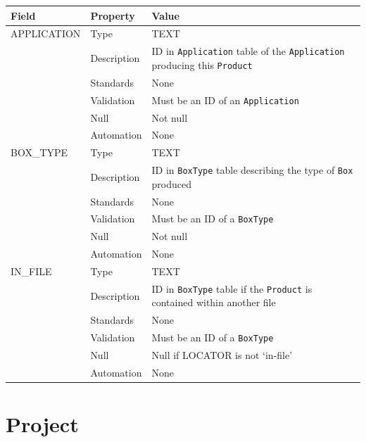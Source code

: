 \documentclass[
]{article}
\newcounter{none}
\begin{document}
{\def\LTcaptype{none} 
\begin{longtable}[]{@{}
  >{\raggedright\arraybackslash}p{}
  >{\raggedright\arraybackslash}p{}
  >{\raggedright\arraybackslash}p{}@{}}
\toprule\noalign{}
\begin{minipage}[b]{\linewidth}\raggedright
Field
\end{minipage} & \begin{minipage}[b]{\linewidth}\raggedright
Property
\end{minipage} & \begin{minipage}[b]{\linewidth}\raggedright
Value
\end{minipage} \\
\midrule\noalign{}
\endhead
\bottomrule\noalign{}
\endlastfoot
APPLICATION & Type & TEXT \\
& Description & ID in \texttt{Application} table of the
\texttt{Application} producing this \texttt{Product} \\
& Standards & None \\
& Validation & Must be an ID of an \texttt{Application} \\
& Null & Not null \\
& Automation & None \\
BOX\_TYPE & Type & TEXT \\
& Description & ID in \texttt{BoxType} table describing the type of
\texttt{Box} produced \\
& Standards & None \\
& Validation & Must be an ID of a \texttt{BoxType} \\
& Null & Not null \\
& Automation & None \\
IN\_FILE & Type & TEXT \\
& Description & ID in \texttt{BoxType} table if the \texttt{Product} is
contained within another file \\
& Standards & None \\
& Validation & Must be an ID of a \texttt{BoxType} \\
& Null & Null if LOCATOR is not `in-file' \\
& Automation & None \\
\end{longtable}
}

\section{Project}\label{project-1}
\end{document}
